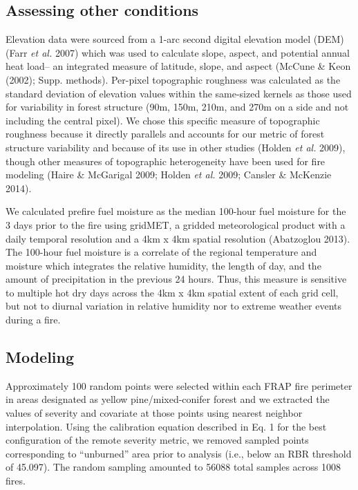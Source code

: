 \documentclass[]{article}
\begin{document}
\hypertarget{assessing-other-conditions}{%
\subsection{Assessing other
conditions}\label{assessing-other-conditions}}

Elevation data were sourced from a 1-arc second digital elevation model
(DEM) (Farr \emph{et al.} 2007) which was used to calculate slope,
aspect, and potential annual heat load-- an integrated measure of
latitude, slope, and aspect (McCune \& Keon (2002); Supp. methods).
Per-pixel topographic roughness was calculated as the standard deviation
of elevation values within the same-sized kernels as those used for
variability in forest structure (90m, 150m, 210m, and 270m on a side and
not including the central pixel). We chose this specific measure of
topographic roughness because it directly parallels and accounts for our
metric of forest structure variability and because of its use in other
studies (Holden \emph{et al.} 2009), though other measures of
topographic heterogeneity have been used for fire modeling (Haire \&
McGarigal 2009; Holden \emph{et al.} 2009; Cansler \& McKenzie 2014).

We calculated prefire fuel moisture as the median 100-hour fuel moisture
for the 3 days prior to the fire using gridMET, a gridded meteorological
product with a daily temporal resolution and a 4km x 4km spatial
resolution (Abatzoglou 2013). The 100-hour fuel moisture is a correlate
of the regional temperature and moisture which integrates the relative
humidity, the length of day, and the amount of precipitation in the
previous 24 hours. Thus, this measure is sensitive to multiple hot dry
days across the 4km x 4km spatial extent of each grid cell, but not to
diurnal variation in relative humidity nor to extreme weather events
during a fire.

\hypertarget{modeling}{%
\subsection{Modeling}\label{modeling}}

Approximately 100 random points were selected within each FRAP fire
perimeter in areas designated as yellow pine/mixed-conifer forest and we
extracted the values of severity and covariate at those points using
nearest neighbor interpolation. Using the calibration equation described
in Eq. 1 for the best configuration of the remote severity metric, we
removed sampled points corresponding to ``unburned'' area prior to
analysis (i.e., below an RBR threshold of 45.097). The random sampling
amounted to 56088 total samples across 1008 fires.
\end{document}
